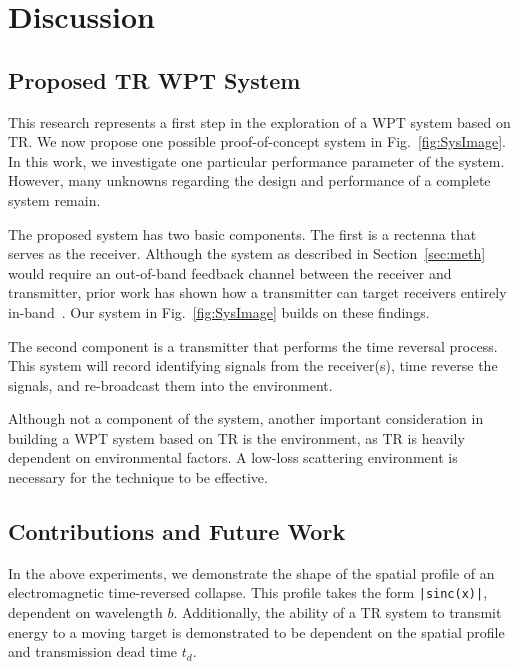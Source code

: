 \section{Discussion}
\label{sec:discussion}

\subsection{Proposed TR WPT System}
\label{sec:system}

This research represents a first step in the exploration of a WPT system based on TR. We now propose one possible proof-of-concept system in Fig.~\ref{fig:SysImage}. In this work, we investigate one particular performance parameter of the system. However, many unknowns regarding the design and performance of a complete system remain.

The proposed system has two basic components. The first is a rectenna that serves as the receiver. Although the system as described in Section~\ref{sec:meth} would require an out-of-band feedback channel between the receiver and transmitter, prior work has shown how a transmitter can target  receivers entirely in-band~\cite{nltr-wave-chaotic,roman}. Our system in Fig.~\ref{fig:SysImage} builds on these findings.

The second component is a transmitter that performs the time reversal process. This system will record identifying signals from the receiver(s), time reverse the signals, and re-broadcast them into the environment.

Although not a component of the system, another important consideration in building a WPT system based on TR is the environment, as TR is heavily dependent on environmental factors. A low-loss scattering environment is necessary for the technique to be effective.

\subsection{Contributions and Future Work}
\label{sec:contrib}

In the above experiments, we demonstrate the shape of the spatial profile of an electromagnetic
time-reversed collapse. This profile takes the form \texttt{|sinc(x)|}, dependent on wavelength $b$.
Additionally, the ability of a TR system to transmit energy to a moving target is
demonstrated to be dependent on the spatial profile and transmission dead
time $t_{d}$.

